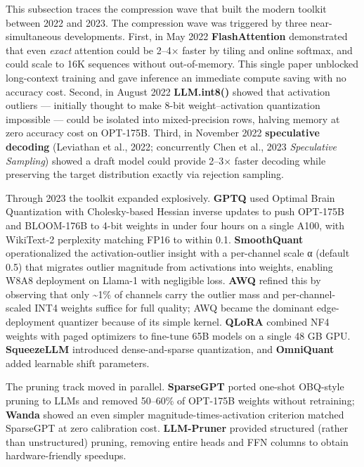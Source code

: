 \documentclass{article}
\begin{document}
This subsection traces the compression wave that built the modern toolkit between 2022 and 2023. The compression wave was triggered by three near-simultaneous developments. First, in May 2022 \textbf{FlashAttention} \citep{dao20222022} demonstrated that even \emph{exact} attention could be 2--4× faster by tiling and online softmax, and could scale to 16K sequences without out-of-memory. This single paper unblocked long-context training and gave inference an immediate compute saving with no accuracy cost. Second, in August 2022 \textbf{LLM.int8()} \citep{dettmers2022llmint88bitmatrixm} showed that activation outliers --- initially thought to make 8-bit weight--activation quantization impossible --- could be isolated into mixed-precision rows, halving memory at zero accuracy cost on OPT-175B. Third, in November 2022 \textbf{speculative decoding} (Leviathan et al., 2022; concurrently Chen et al., 2023 \emph{Speculative Sampling}) showed a draft model could provide 2--3× faster decoding while preserving the target distribution exactly via rejection sampling.

Through 2023 the toolkit expanded explosively. \textbf{GPTQ} \citep{frantar2023gptqaccurateposttr} used Optimal Brain Quantization with Cholesky-based Hessian inverse updates to push OPT-175B and BLOOM-176B to 4-bit weights in under four hours on a single A100, with WikiText-2 perplexity matching FP16 to within 0.1. \textbf{SmoothQuant} \citep{xiao20232022} operationalized the activation-outlier insight with a per-channel scale α (default 0.5) that migrates outlier magnitude from activations into weights, enabling W8A8 deployment on Llama-1 with negligible loss. \textbf{AWQ} \citep{lin20242023} refined this by observing that only \textasciitilde1\% of channels carry the outlier mass and per-channel-scaled INT4 weights suffice for full quality; AWQ became the dominant edge-deployment quantizer because of its simple kernel. \textbf{QLoRA} \citep{dettmers2023qloraefficientfine} combined NF4 weights with paged optimizers to fine-tune 65B models on a single 48 GB GPU. \textbf{SqueezeLLM} \citep{kim20232023} introduced dense-and-sparse quantization, and \textbf{OmniQuant} \citep{shao20242023} added learnable shift parameters.

The pruning track moved in parallel. \textbf{SparseGPT} \citep{frantar2023gptqaccurateposttr} ported one-shot OBQ-style pruning to LLMs and removed 50--60\% of OPT-175B weights without retraining; \textbf{Wanda} \citep{sun2024asimpleandeffectiv} showed an even simpler magnitude-times-activation criterion matched SparseGPT at zero calibration cost. \textbf{LLM-Pruner} \citep{ma2023llmpruneronthestru} provided structured (rather than unstructured) pruning, removing entire heads and FFN columns to obtain hardware-friendly speedups.
\end{document}
